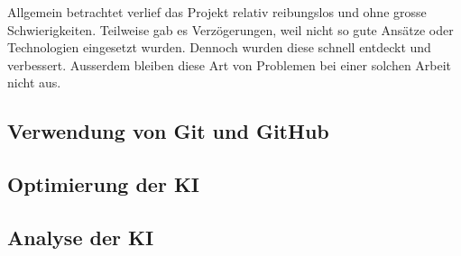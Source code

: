 Allgemein betrachtet verlief das Projekt relativ reibungslos und ohne grosse
Schwierigkeiten. Teilweise gab es Verzögerungen, weil nicht so gute Ansätze oder
Technologien eingesetzt wurden. Dennoch wurden diese schnell entdeckt und
verbessert. Ausserdem bleiben diese Art von Problemen bei einer solchen Arbeit
nicht aus.


\subsection*{Verwendung von Git und GitHub}


\subsection*{Optimierung der KI}


\subsection*{Analyse der KI}

